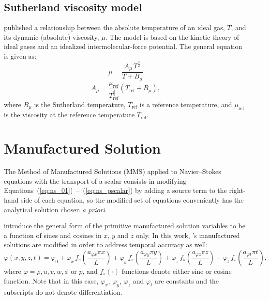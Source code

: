 \documentclass[10pt]{article}
\begin{document}
\subsection{Sutherland viscosity model}

\citet{Sutherland1893} published a relationship between the absolute temperature of an ideal gas, $T$,  and its dynamic (absolute) viscosity, $\mu$. The model is based on the kinetic theory of ideal gases and an idealized intermolecular-force potential. The general equation is given as:
\begin{equation}
\label{eq:Sutherland01}
 \mu  =\dfrac{A_\mu \, T^{\frac{3}{2}}}{T+B_\mu}
\end{equation}
\begin{equation}
\label{eq:Sutherland02}
   A_\mu = \dfrac{\mu_\text{ref}}{T_{\text{ref}}^{\frac{3}{2}}}(T_\text{ref} + B_\mu),
\end{equation}
where $B_\mu$ is the Sutherland temperature, $T_{\text{ref}}$ is a reference temperature,  and $\mu_\text{ref}$ is the viscosity at the reference temperature $T_\text{ref}$.


\section{Manufactured Solution}

The Method of Manufactured Solutions (MMS) applied to Navier--Stokes equations with the transport of a scalar consists in modifying Equations~(\ref{eq:ns_01})~--~(\ref{eq:ns_pscalar}) by adding a source term to the right-hand side of each equation, so the modified set of equations conveniently has the analytical solution chosen \textit{a priori}.

\citet{Roy2002} introduce the general form of the primitive manufactured solution variables to be  a function of sines and cosines in $x$, $y$ and $z$ only. In this work, \citet{Roy2002}'s manufactured solutions are modified in order to address temporal accuracy as well:
\begin{equation}
 \label{eq:manufactured01}
  \varphi (x,y,z,t) = \varphi_0+ \varphi_x\, f_s \left(\frac{a_{\varphi x} \pi x}{L} \right) +  \varphi_y \,f_s\left(\frac{a_{\varphi y} \pi y}{L}\right) + \varphi_z \,f_s\left(\frac{a_{\varphi z} \pi z}{L}\right)+ \varphi_t \,f_s\left(\frac{a_{\varphi t} \pi t}{L}\right),
\end{equation}
where $\varphi=\rho,u,v,w, \phi$ or $p$, and $f_s(\cdot)$ functions denote either sine or cosine function. Note that in this case, $\varphi_x$, $\varphi_y$, $\varphi_z$  and $\varphi_t$ are constants  and the subscripts do not denote differentiation.
\end{document}
